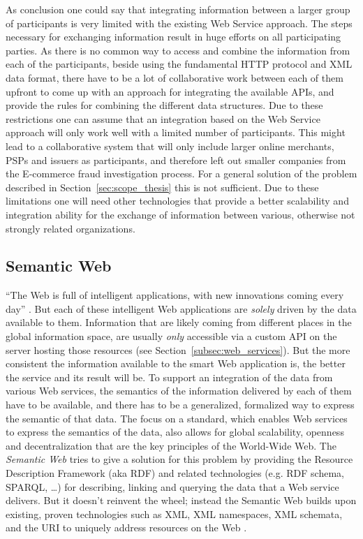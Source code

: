 As conclusion one could say that integrating information between a larger group of participants is very limited with the existing Web Service approach. The steps necessary for exchanging information result in huge efforts on all participating parties. As there is no common way to access and combine the information from each of the participants, beside using the fundamental \gls{HTTP} protocol and \gls{XML} data format, there have to be a lot of collaborative work between each of them upfront to come up with an approach for integrating the available \gls{API}s, and provide the rules for combining the different data structures. Due to these restrictions one can assume that an integration based on the Web Service approach will only work well with a limited number of participants. This might lead to a collaborative system that will only include larger online merchants, \gls{PSP}s and issuers as participants, and therefore left out smaller companies from the \gls{E-commerce} fraud investigation process. For a general solution of the problem described in Section~\ref{sec:scope_thesis} this is not sufficient. Due to these limitations one will need other technologies that provide a better scalability and integration ability for the exchange of information between various, otherwise not strongly related organizations.


\subsection{Semantic Web}
\label{subsec:web_data}

``The Web is full of intelligent applications, with new innovations coming every day'' \citep{allemang2011semantic}. But each of these intelligent Web applications are \emph{solely} driven by the data available to them. Information that are likely coming from different places in the global information space, are usually \emph{only} accessible via a custom \gls{API} on the server hosting those resources (see Section~\ref{subsec:web_services}). But the more consistent the information available to the smart Web application is, the better the service and its result will be. To support an integration of the data from various Web services, the semantics of the information delivered by each of them have to be available, and there has to be a generalized, formalized way to express the semantic of that data. The focus on a standard, which enables Web services to express the semantics of the data, also allows for global scalability, openness and decentralization that are the key principles of the World-Wide Web. The \emph{Semantic Web} tries to give a solution for this problem by providing the Resource Description Framework (aka \gls{RDF}) and related technologies (e.g. \gls{RDF} schema, \gls{SPARQL}, \ldots) for describing, linking and querying the data that a Web service delivers. But it doesn’t reinvent the wheel; instead the Semantic Web builds upon existing, proven technologies such as \gls{XML}, \gls{XML} namespaces, \gls{XML} schemata, and the \gls{URI} to uniquely address resources on the Web \citep{allemang2011semantic}. \\

